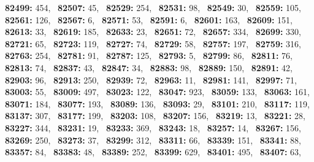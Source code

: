 \textbf{82499:} 454,\allowbreak~ 
\textbf{82507:} 45,\allowbreak~ 
\textbf{82529:} 254,\allowbreak~ 
\textbf{82531:} 98,\allowbreak~ 
\textbf{82549:} 30,\allowbreak~ 
\textbf{82559:} 105,\allowbreak~ 
\textbf{82561:} 126,\allowbreak~ 
\textbf{82567:} 6,\allowbreak~ 
\textbf{82571:} 53,\allowbreak~ 
\textbf{82591:} 6,\allowbreak~ 
\textbf{82601:} 163,\allowbreak~ 
\textbf{82609:} 151,\allowbreak~ 
\textbf{82613:} 33,\allowbreak~ 
\textbf{82619:} 185,\allowbreak~ 
\textbf{82633:} 23,\allowbreak~ 
\textbf{82651:} 72,\allowbreak~ 
\textbf{82657:} 334,\allowbreak~ 
\textbf{82699:} 330,\allowbreak~ 
\textbf{82721:} 65,\allowbreak~ 
\textbf{82723:} 119,\allowbreak~ 
\textbf{82727:} 74,\allowbreak~ 
\textbf{82729:} 58,\allowbreak~ 
\textbf{82757:} 197,\allowbreak~ 
\textbf{82759:} 316,\allowbreak~ 
\textbf{82763:} 254,\allowbreak~ 
\textbf{82781:} 91,\allowbreak~ 
\textbf{82787:} 125,\allowbreak~ 
\textbf{82793:} 5,\allowbreak~ 
\textbf{82799:} 86,\allowbreak~ 
\textbf{82811:} 76,\allowbreak~ 
\textbf{82813:} 74,\allowbreak~ 
\textbf{82837:} 43,\allowbreak~ 
\textbf{82847:} 34,\allowbreak~ 
\textbf{82883:} 98,\allowbreak~ 
\textbf{82889:} 150,\allowbreak~ 
\textbf{82891:} 42,\allowbreak~ 
\textbf{82903:} 96,\allowbreak~ 
\textbf{82913:} 250,\allowbreak~ 
\textbf{82939:} 72,\allowbreak~ 
\textbf{82963:} 11,\allowbreak~ 
\textbf{82981:} 141,\allowbreak~ 
\textbf{82997:} 71,\allowbreak~ 
\textbf{83003:} 55,\allowbreak~ 
\textbf{83009:} 497,\allowbreak~ 
\textbf{83023:} 122,\allowbreak~ 
\textbf{83047:} 923,\allowbreak~ 
\textbf{83059:} 133,\allowbreak~ 
\textbf{83063:} 161,\allowbreak~ 
\textbf{83071:} 184,\allowbreak~ 
\textbf{83077:} 193,\allowbreak~ 
\textbf{83089:} 136,\allowbreak~ 
\textbf{83093:} 29,\allowbreak~ 
\textbf{83101:} 210,\allowbreak~ 
\textbf{83117:} 119,\allowbreak~ 
\textbf{83137:} 307,\allowbreak~ 
\textbf{83177:} 199,\allowbreak~ 
\textbf{83203:} 108,\allowbreak~ 
\textbf{83207:} 156,\allowbreak~ 
\textbf{83219:} 13,\allowbreak~ 
\textbf{83221:} 28,\allowbreak~ 
\textbf{83227:} 344,\allowbreak~ 
\textbf{83231:} 19,\allowbreak~ 
\textbf{83233:} 369,\allowbreak~ 
\textbf{83243:} 18,\allowbreak~ 
\textbf{83257:} 14,\allowbreak~ 
\textbf{83267:} 156,\allowbreak~ 
\textbf{83269:} 250,\allowbreak~ 
\textbf{83273:} 37,\allowbreak~ 
\textbf{83299:} 312,\allowbreak~ 
\textbf{83311:} 66,\allowbreak~ 
\textbf{83339:} 151,\allowbreak~ 
\textbf{83341:} 88,\allowbreak~ 
\textbf{83357:} 84,\allowbreak~ 
\textbf{83383:} 48,\allowbreak~ 
\textbf{83389:} 252,\allowbreak~ 
\textbf{83399:} 629,\allowbreak~ 
\textbf{83401:} 495,\allowbreak~ 
\textbf{83407:} 63,\allowbreak~ 

